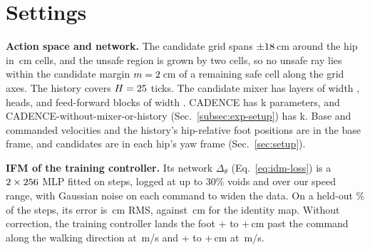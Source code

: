 
\clearpage
\section{Settings}
\label{app:settings}


\noindent\textbf{Action space and network.}
 The candidate grid spans
$\pm18$\,cm around the hip in \corlScanResCm\,cm cells,
and the unsafe region is grown by two cells, so no unsafe ray lies
within the candidate margin $m = 2$\,cm of a remaining safe
cell along the grid axes. The history covers $H = 25$
ticks. The candidate mixer has \corlMixerLayers{} layers of width
\corlMixerDim, \corlMixerHeads{} heads, and feed-forward blocks of
width \corlMixerFF. CADENCE has
\corlParamsGaitNetK{}k parameters, and CADENCE-without-mixer-or-history
(Sec.~\ref{subsec:exp-setup}) has \corlParamsPerCandidateK{}k.
Base and commanded velocities and the history's hip-relative foot
positions are in the base frame, and candidates are in each hip's yaw
frame (Sec.~\ref{sec:setup}).

\noindent\textbf{IFM of the training controller.}
 Its network $\Delta_\theta$ (Eq.~\eqref{eq:idm-loss}) is
a $2 \times 256$ MLP fitted on \corlIdmFootsteps{} steps,
logged at up to 30\% voids and over our speed range, with Gaussian
noise on each command to widen the data. On a held-out \corlIdmHeldOutPct\% of the steps, its error
is \corlIdmRmsCm\,cm RMS, against \corlIdmIdentityRmsCm\,cm for the
identity map. Without correction, the training controller lands the
foot +\corlOvershootSlowMin{} to +\corlOvershootSlowMax\,cm past the
command along the walking direction at \corlSimSpeedSlow\,m/s and
+\corlOvershootFastMin{} to +\corlOvershootFastMax\,cm at
\corlSimSpeedFast\,m/s.

